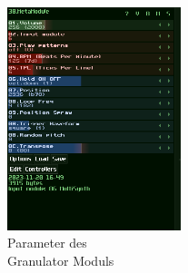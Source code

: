 \documentclass[12pt]{scrartcl}%
\theoremstyle{nonumberplain}
\begin{document}
\begin{figure}
  \centering
  \includegraphics[width=0.45\textwidth]{sunvox_3}
  \caption{Parameter des\\Granulator Moduls}
\end{figure}
\end{document}
